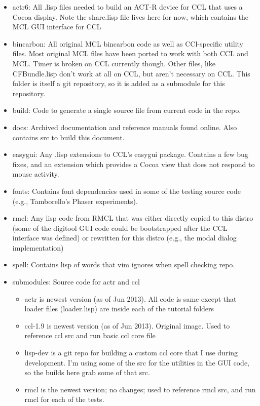 \documentclass[12pt]{article} %
\begin{document}
\begin{itemize}

\item actr6: All .lisp files needed to build an ACT-R device for CCL that uses a Cocoa display. Note the share.lisp file lives here for now, which contains the MCL GUI interface for CCL

\item bincarbon:
  All original MCL bincarbon code as well as CCl-specific utility files. 
  Most original MCL files have been ported to work with both CCL and MCL.
  Timer is broken on CCL currently though.
  Other files, like CFBundle.lisp don't work at all on CCL, but aren't necessary on CCL.
  This folder is itself a git repository, so it is added as a submodule for this repository.

\item build: Code to generate a single source file from current code in the repo.

\item docs:
  Archived documentation and reference manuals found online.
  Also contains src to build this document.

\item easygui:
  Any .lisp extensions to CCL's easygui package.
  Contains a few bug fixes, and an extension which provides a Cocoa view that does not respond to mouse activity.

\item fonts: Contains font dependencies used in some of the testing source code (e.g., Tamborello's Phaser experiments).

\item rmcl:
  Any lisp code from RMCL that was either directly copied to this distro (some of the digitool GUI code could be bootstrapped after the CCL interface was defined)
  or rewritten for this distro (e.g., the modal dialog implementation)

\item spell: Contains lisp of words that vim ignores when spell checking repo.

\item submodules: Source code for actr and ccl
	\begin{itemize}
	\item actr is newest version (as of Jun 2013). All code is same except that loader files (loader.lisp) are inside each of the tutorial folders
	\item ccl-1.9 is newest version (as of Jun 2013). Original image. Used to reference ccl src and run basic ccl core file
	\item lisp-dev is a git repo for building a custom ccl core that I use during development.
	  I'm using some of the src for the utilities in the GUI code, so the builds here grab some of that src.
	\item rmcl is the newest version; no changes; used to reference rmcl src, and run rmcl for each of the tests.
	\end{itemize}


\end{itemize}
\end{document}
